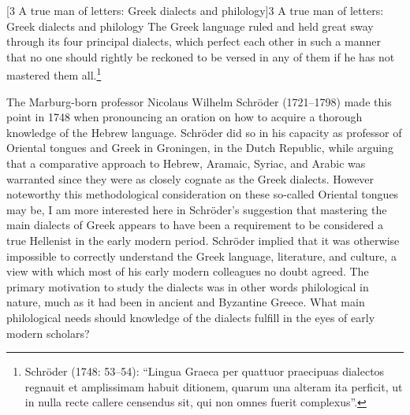 \documentclass[12pt]{article}
\makeatletter
\renewcommand\section{\@startsection{section}{1}{0.0in}{0.1665in}{0.0835in}{\normalfont\normalsize\fontsize{14pt}{16.8pt}\selectfont\rmfamily\bfseries}}
\newenvironment{styleStandard}{\renewcommand\baselinestretch{1.25}\setlength\leftskip{0in}\setlength\rightskip{0in}\setlength\parindent{0.1972in}\setlength\parfillskip{0pt plus 1fil}\setlength\parskip{0in plus 1pt}\writerlistparindent\writerlistleftskip\leavevmode\normalfont\normalsize\writerlistlabel\ignorespaces}{\unskip\vspace{0in plus 1pt}\par}
\newenvironment{styleQuote}{\renewcommand\baselinestretch{1.25}\setlength\leftskip{0.3937in}\setlength\rightskip{0in}\setlength\parindent{0in}\setlength\parfillskip{0pt plus 1fil}\setlength\parskip{0.1665in plus 0.016649999in}\writerlistparindent\writerlistleftskip\leavevmode\normalfont\normalsize\writerlistlabel\ignorespaces}{\unskip\vspace{0.1665in plus 0.016649999in}\par}
\newcommand\writerlistleftskip{}
\newcommand\writerlistparindent{}
\newcommand\writerlistlabel{}
\makeatother
\begin{document}
\clearpage\section[3 A true man of letters: Greek dialects and philology]{\textsc{3 }A true man of letters: Greek dialects and philology}
\hypertarget{Toc19704818}{}\begin{styleQuote}
The Greek language ruled and held great sway through its four principal dialects, which perfect each other in such a manner that no one should rightly be reckoned to be versed in any of them if he has not mastered them all.\footnote{ Schröder (1748: 53–54): “Lingua Graeca per quattuor praecipuas dialectos regnauit et amplissimam habuit ditionem, quarum una alteram ita perficit, ut in nulla recte callere censendus sit, qui non omnes fuerit complexus”.}
\end{styleQuote}

\begin{styleStandard}
The Marburg-born professor Nicolaus Wilhelm Schröder (1721–1798) made this point in 1748 when pronouncing an oration on how to acquire a thorough knowledge of the Hebrew language. Schröder did so in his capacity as professor of Oriental tongues and Greek in Groningen, in the Dutch Republic, while arguing that a comparative approach to Hebrew, Aramaic, Syriac, and Arabic was warranted since they were as closely cognate as the Greek dialects. However noteworthy this methodological consideration on these so-called Oriental tongues may be, I am more interested here in Schröder’s suggestion that mastering the main dialects of Greek appears to have been a requirement to be considered a true Hellenist in the early modern period. Schröder implied that it was otherwise impossible to correctly understand the Greek language, literature, and culture, a view with which most of his early modern colleagues no doubt agreed. The primary motivation to study the dialects was in other words philological in nature, much as it had been in ancient and Byzantine Greece. What main philological needs should knowledge of the dialects fulfill in the eyes of early modern scholars?
\end{styleStandard}
\end{document}
